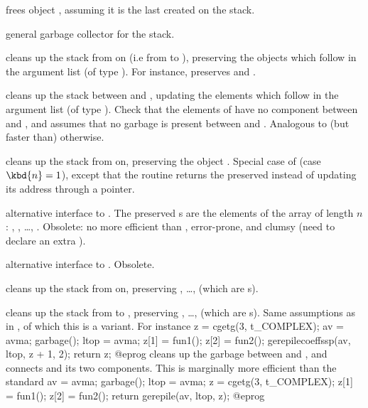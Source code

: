  frees object , assuming it is the last created
on the stack.

 general garbage collector
for the stack.

 cleans up the stack from
 on (i.e from  to ), preserving the  objects
which follow in the argument list (of type ). For instance,
 preserves  and .

cleans up the stack between  and , updating
the  elements which follow  in the argument list (of type
). Check that the elements of  have no component between
 and , and assumes that no garbage is present between
 and . Analogous to (but faster than) 
otherwise.

 cleans up the stack  from
 on, preserving the object . Special case of 
(case $\kbd{n} = 1$), except that the routine returns the preserved 
instead of updating its address through a pointer.

 alternative interface
to . The preserved s are the elements of the array
 of length $n$: , , \dots,
. Obsolete: no more efficient than ,
error-prone, and clumsy (need to declare an extra ).

alternative interface to . Obsolete.

 cleans up the stack
from  on, preserving , \dots,  (which are
s).

cleans up the stack from  to , preserving ,
\dots,  (which are s). Same assumptions as in
, of which this is a variant. For instance
\bprog
  z = cgetg(3, t_COMPLEX);
  av = avma; garbage(); ltop = avma;
  z[1] = fun1();
  z[2] = fun2();
  gerepilecoeffssp(av, ltop, z + 1, 2);
  return z;
@eprog\noindent
cleans up the garbage between  and , and connects 
and its two components. This is marginally more efficient than the standard
\bprog
  av = avma; garbage(); ltop = avma;
  z = cgetg(3, t_COMPLEX);
  z[1] = fun1();
  z[2] = fun2(); return gerepile(av, ltop, z);
@eprog\noindent

